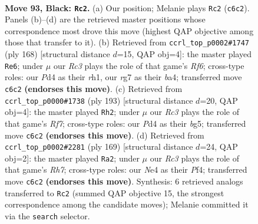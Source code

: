 \documentclass[11pt]{article}
\begin{document}
\clearpage

\begin{figure}[p]\centering
\begin{subfigure}{0.46\textwidth}\centering
\resizebox{\linewidth}{!}{%
\newchessgame
\chessboard[
  setfen={8/6R1/2r4p/4pk2/1K1pn2b/8/8/8 b - - 5 93},
  showmover=false,
  pgfstyle=straightmove, color=movearrow, markmove={c6-c2}
]}
\caption{}
\end{subfigure}\hfill
\begin{subfigure}{0.46\textwidth}\centering
\resizebox{\linewidth}{!}{%
\newchessgame
\chessboard[
  setfen={8/2k5/5R2/8/bPK5/P2N4/8/7r w - - 35 85},
  showmover=false,
  pgfstyle=straightmove, color=movearrow, markmove={f6-e6}
]}
\caption{}
\end{subfigure}
\\[4pt]
\begin{subfigure}{0.46\textwidth}\centering
\resizebox{\linewidth}{!}{%
\newchessgame
\chessboard[
  setfen={4R3/8/2n5/2k3BP/3p4/8/5r2/3K4 b - - 0 97},
  showmover=false,
  pgfstyle=straightmove, color=movearrow, markmove={f2-h2}
]}
\caption{}
\end{subfigure}\hfill
\begin{subfigure}{0.46\textwidth}\centering
\resizebox{\linewidth}{!}{%
\newchessgame
\chessboard[
  setfen={8/8/8/5p2/5pk1/1R6/7r/5K2 b - - 1 85},
  showmover=false,
  pgfstyle=straightmove, color=movearrow, markmove={h2-a2}
]}
\caption{}
\end{subfigure}
\caption{\textbf{Move 93, Black: \texttt{Rc2}.} (a) Our position; Melanie plays \texttt{Rc2} (\texttt{c6c2}). Panels (b)--(d) are the retrieved master positions whose correspondence most drove this move (highest QAP objective among those that transfer to it). (b) Retrieved from \texttt{ccrl\_top\_p0002\#1747} (ply 168) [structural distance $d$=15, QAP obj=4]: the master played \texttt{Re6}; under $\mu$ our \emph{Rc3} plays the role of that game's \emph{Rf6}; cross-type roles: our \emph{P}d4 as their \emph{r}h1, our \emph{r}g7 as their \emph{b}a4; transferred move \texttt{c6c2} \textbf{(endorses this move)}. (c) Retrieved from \texttt{ccrl\_top\_p0000\#1738} (ply 193) [structural distance $d$=20, QAP obj=4]: the master played \texttt{Rh2}; under $\mu$ our \emph{Rc3} plays the role of that game's \emph{Rf7}; cross-type roles: our \emph{P}d4 as their \emph{b}g5; transferred move \texttt{c6c2} \textbf{(endorses this move)}. (d) Retrieved from \texttt{ccrl\_top\_p0002\#2281} (ply 169) [structural distance $d$=24, QAP obj=2]: the master played \texttt{Ra2}; under $\mu$ our \emph{Rc3} plays the role of that game's \emph{Rh7}; cross-type roles: our \emph{N}e4 as their \emph{P}f4; transferred move \texttt{c6c2} \textbf{(endorses this move)}. Synthesis: 6 retrieved analogs transferred to \texttt{Rc2} (summed QAP objective 15, the strongest correspondence among the candidate moves); Melanie committed it via the \texttt{search} selector.}
\label{fig:thought-m185}
\end{figure}
\end{document}
